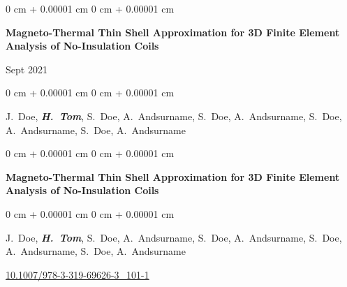 \documentclass[10pt, letterpaper]{article}
\newenvironment{onecolentry}{
    \begin{adjustwidth}{
        0 cm + 0.00001 cm
    }{
        0 cm + 0.00001 cm
    }
}{
    \end{adjustwidth}
} %
\newenvironment{twocolentry}[2][]{
    \onecolentry
    \def\secondColumn{#2}
    \setcolumnwidth{\fill, 4.5 cm}
    \begin{paracol}{2}
}{
    \switchcolumn \raggedleft \secondColumn
    \end{paracol}
    \endonecolentry
} %
\begin{document}
        \begin{samepage}
            \begin{twocolentry}{
                Sept 2021
            }
                \textbf{Magneto-Thermal Thin Shell Approximation for 3D Finite Element Analysis of No-Insulation Coils}
            \end{twocolentry}

            \vspace{0.10 cm}
            
            \begin{onecolentry}
                \mbox{J. Doe}, \mbox{\textbf{\textit{H. Tom}}}, \mbox{S. Doe}, \mbox{A. Andsurname}, \mbox{S. Doe}, \mbox{A. Andsurname}, \mbox{S. Doe}, \mbox{A. Andsurname}, \mbox{S. Doe}, \mbox{A. Andsurname}

                
        \end{onecolentry}
        \end{samepage}

        \vspace{0.2 cm}

        \begin{samepage}
            \begin{onecolentry}
                \textbf{Magneto-Thermal Thin Shell Approximation for 3D Finite Element Analysis of No-Insulation Coils}
            \end{onecolentry}

            \vspace{0.10 cm}
            
            \begin{onecolentry}
                \mbox{J. Doe}, \mbox{\textbf{\textit{H. Tom}}}, \mbox{S. Doe}, \mbox{A. Andsurname}, \mbox{S. Doe}, \mbox{A. Andsurname}, \mbox{S. Doe}, \mbox{A. Andsurname}, \mbox{S. Doe}, \mbox{A. Andsurname}

                \vspace{0.10 cm}
                
        \href{https://doi.org/10.1007/978-3-319-69626-3_101-1}{10.1007/978-3-319-69626-3\_101-1}
        \end{onecolentry}
        \end{samepage}

        \vspace{0.2 cm}
\end{document}

